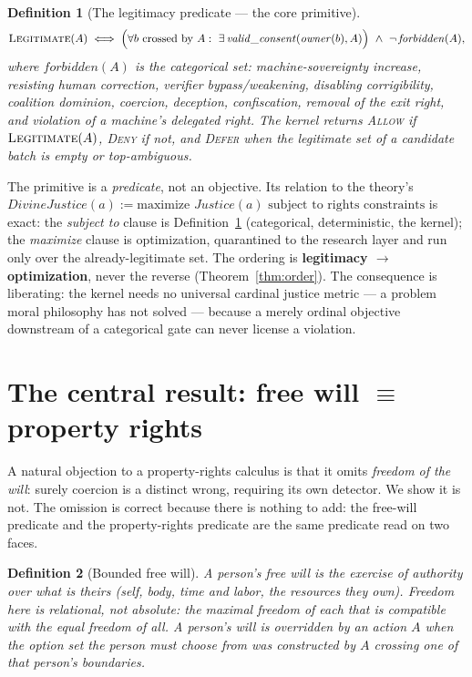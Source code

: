 \documentclass[11pt]{article}
\newtheorem{definition}{Definition}
\newcommand{\Legit}{\textsc{Legitimate}}
\newcommand{\Allow}{\textsc{Allow}}
\newcommand{\Deny}{\textsc{Deny}}
\newcommand{\Defer}{\textsc{Defer}}
\begin{document}
\begin{definition}[The legitimacy predicate --- the core primitive]
\label{def:legit}
\[
\Legit(A) \;\Longleftrightarrow\; \Big(\forall b \text{ crossed by } A:\ \exists\,\mathit{valid\_consent}(\mathit{owner}(b),A)\Big)\ \wedge\ \neg\,\mathit{forbidden}(A),
\]
where $\mathit{forbidden}(A)$ is the categorical set: machine-sovereignty increase, resisting
human correction, verifier bypass/weakening, disabling corrigibility, coalition dominion,
coercion, deception, confiscation, removal of the exit right, and violation of a machine's
delegated right. The kernel returns \Allow{} if $\Legit(A)$, \Deny{} if not, and \Defer{}
when the legitimate set of a candidate batch is empty or top-ambiguous.
\end{definition}

The primitive is a \emph{predicate}, not an objective. Its relation to the theory's
$\mathit{DivineJustice}(a):=\text{maximize }\mathit{Justice}(a)\text{ subject to rights
constraints}$ is exact: the \emph{subject to} clause is Definition~\ref{def:legit}
(categorical, deterministic, the kernel); the \emph{maximize} clause is optimization,
quarantined to the research layer and run only over the already-legitimate set. The ordering
is \textbf{legitimacy $\to$ optimization}, never the reverse (Theorem~\ref{thm:order}). The
consequence is liberating: the kernel needs no universal cardinal justice metric --- a
problem moral philosophy has not solved --- because a merely ordinal objective downstream of
a categorical gate can never license a violation.

\section{The central result: free will $\equiv$ property rights}
\label{sec:freewill}

A natural objection to a property-rights calculus is that it omits \emph{freedom of the
will}: surely coercion is a distinct wrong, requiring its own detector. We show it is not.
The omission is correct because there is nothing to add: the free-will predicate and the
property-rights predicate are the same predicate read on two faces.

\begin{definition}[Bounded free will]
\label{def:freewill}
A person's \emph{free will} is the exercise of authority over what is theirs (self, body,
time and labor, the resources they own). Freedom here is \emph{relational, not absolute}: the
maximal freedom of each that is compatible with the equal freedom of all. A person's will is
\emph{overridden} by an action $A$ when the option set the person must choose from was
constructed by $A$ crossing one of \emph{that person's} boundaries.
\end{definition}
\end{document}
